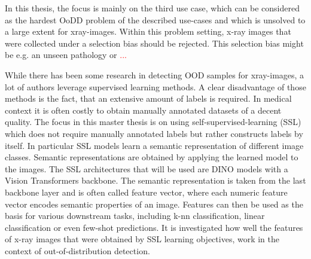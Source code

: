 In this thesis, the focus is mainly on the third use case, which can be considered as the hardest OoDD problem of the described use-cases and which is unsolved to a large extent for xray-images.
Within this problem setting, x-ray images that were collected under a selection bias should be rejected.
This selection bias might be e.g. an unseen pathology or \textcolor{red}{...}
\par
While there has been some research in detecting OOD samples for xray-images, a lot of authors leverage supervised learning methods.
A clear disadvantage of those methods is the fact, that an extensive amount of labels is required.
In medical context it is often costly to obtain manually annotated datasets of a decent quality.
The focus in this master thesis is on using self-supervised-learning (SSL) which does not require manually annotated labels but rather constructs labels by itself. 
In particular SSL models learn a semantic representation of different image classes.
Semantic representations are obtained by applying the learned model to the images.
The SSL architectures that will be used are DINO models with a Vision Transformers backbone.
The semantic representation is taken from the last backbone layer and is often called feature vector, where each numeric feature vector encodes semantic properties of an image.
Features can then be used as the basis for various downstream tasks, including k-nn classification, linear classification or even few-shot predictions.
It is investigated how well the features of x-ray images that were obtained by SSL learning objectives, work in the context of out-of-distribution detection.